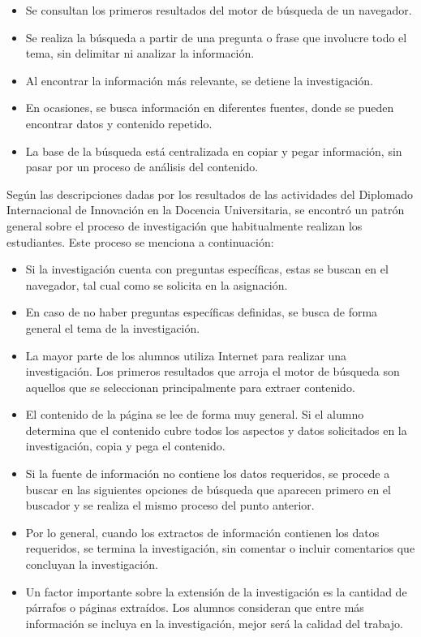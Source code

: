\begin{itemize}
  \item Se consultan los primeros resultados del motor de búsqueda de un navegador.
  \item Se realiza la búsqueda a partir de una pregunta o frase que involucre todo el tema, sin delimitar ni analizar la información.
  \item Al encontrar la información más relevante, se detiene la investigación.
  \item En ocasiones, se busca información en diferentes fuentes, donde se pueden encontrar datos y contenido repetido.
  \item La base de la búsqueda está centralizada en copiar y pegar información, sin pasar por un proceso de análisis del contenido.
\end{itemize}

Según las descripciones dadas por los resultados de las actividades del Diplomado Internacional de Innovación en la Docencia Universitaria, se encontró un patrón general sobre el proceso de investigación que habitualmente realizan los estudiantes. Este proceso se menciona a continuación:

\begin{itemize}
  \item Si la investigación cuenta con preguntas específicas, estas se buscan en el navegador, tal cual como se solicita en la asignación.
  \item En caso de no haber preguntas específicas definidas, se busca de forma general el tema de la investigación.
  \item La mayor parte de los alumnos utiliza Internet para realizar una investigación. Los primeros resultados que arroja el motor de búsqueda son aquellos que se seleccionan principalmente para extraer contenido.
  \item El contenido de la página se lee de forma muy general. Si el alumno determina que el contenido cubre todos los aspectos y datos solicitados en la investigación, copia y pega el contenido.
  \item Si la fuente de información no contiene los datos requeridos, se procede a buscar en las siguientes opciones de búsqueda que aparecen primero en el buscador y se realiza el mismo proceso del punto anterior.
  \item Por lo general, cuando los extractos de información contienen los datos requeridos, se termina la investigación, sin comentar o incluir comentarios que concluyan la investigación.
  \item Un factor importante sobre la extensión de la investigación es la cantidad de párrafos o páginas extraídos. Los alumnos consideran que entre más información se incluya en la investigación, mejor será la calidad del trabajo.
\end{itemize}

